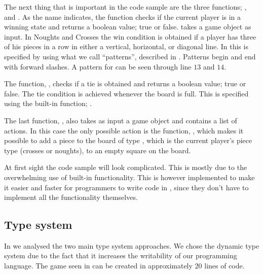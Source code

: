 
The next thing that is important in the code sample are the three functions; 
,  and . 
As the name indicates, the function  checks if the current player
is in a winning state and returns a boolean value; true or false.
 takes a game object as input. In Noughts and Crosses the
win condition is obtained if a player has three of his pieces in a row in
either a vertical, horizontal, or diagonal line. In \productname{} this is
specified by using what we call ``patterns'', described in
. Patterns begin and end with forward slashes. A pattern for
 can be seen through line $13$ and $14$.

The function, , checks if a tie is obtained and
returns a boolean value; true or false. The tie condition is achieved whenever
the board is full. This is specified using the built-in function;
. 

The last function, , also takes as input a game object and
contains a list of actions. In this case the only possible action is the
function, , which makes it possible to add a piece to the
board of type , which is the current player's piece type (crosses
or noughts), to an empty square on the board.

At first sight the code sample will look complicated. This is mostly due to the
overwhelming use of built-in functionality. This is however implemented to make
it easier and faster for programmers to write code in \productname{}, since they
don't have to implement all the functionality themselves.

\subsection*{Type system}

In  we analysed the two main type system
approaches. We chose the dynamic type system due to the fact that it increases
the writability of our programming language. The game seen in 
can be created in approximately $20$ lines of code.

